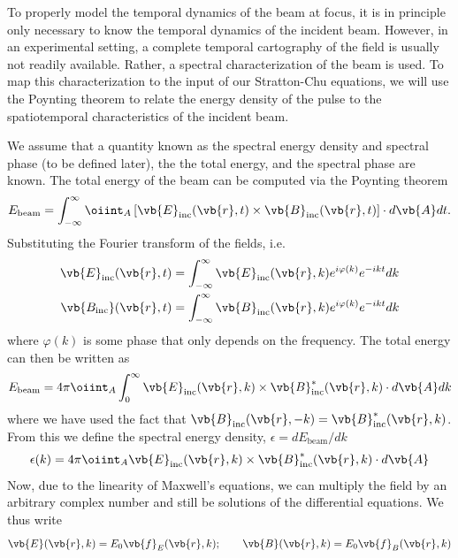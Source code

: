 \documentclass[11pt,SymmetricalJury]{inrsthesis/inrsthesis}
\begin{document}
To properly model the temporal dynamics of the beam at focus, it is in principle
only necessary to know the temporal dynamics of the incident beam. However, in
an experimental setting, a complete temporal cartography of the field is usually
not readily available. Rather, a spectral characterization of the beam is used.
To map this characterization to the input of our Stratton-Chu equations, we will
use the Poynting theorem to relate the energy density of the pulse to the
spatiotemporal characteristics of the incident beam.

We assume that a quantity known as the spectral energy density and spectral
phase (to be defined later), the the total energy, and the spectral phase are
known. The total energy of the beam can be computed via the Poynting theorem
  \begin{equation}
    E_\text{beam}
      =
      \int_{-\infty}^\infty \oiint_A
        \left[\vb{E}_\text{inc}(\vb{r},t)\times\vb{B}_\text{inc}(\vb{r},t)\right]\cdot d\vb{A}dt.
  \end{equation}
Substituting the Fourier transform of the fields, i.e.
  \begin{align}
    \vb{E}_\text{inc}(\vb{r},t) &=
      \int_{-\infty}^\infty
        \vb{E}_\text{inc}(\vb{r},k)e^{i\varphi(k)}e^{-ik t} dk \\
    \vb{B_\text{inc}}(\vb{r},t) &=
      \int_{-\infty}^\infty
        \vb{B}_\text{inc}(\vb{r},k)e^{i\varphi(k)}e^{-ik t} dk
  \end{align}
where $\varphi(k)$ is some phase that only depends on the frequency. The total
energy can then be written as
  \begin{equation}
    E_\text{beam} = 4\pi \oiint_A \int_0^\infty
        \real{\vb{E}_\text{inc}(\vb{r},k)\times\vb{B}_\text{inc}^*(\vb{r},k)}\cdot d\vb{A}dk
  \end{equation}
where we have used the fact that
$\vb{B}_\text{inc}(\vb{r},-k)=\vb{B}_\text{inc}^*(\vb{r},k)$. From this we
define the spectral energy density,  $\epsilon=dE_\text{beam}/dk$
  \begin{equation}
    \epsilon(k)
      = 4\pi\oiint_A \real{\vb{E}_\text{inc}(\vb{r},k)\times\vb{B}_\text{inc}^*(\vb{r},k)}\cdot d\vb{A}
  \end{equation}
Now, due to the linearity of Maxwell's equations, we can multiply the field by
an arbitrary complex number and still be solutions of the differential
equations. We thus write
  \begin{equation}
    \vb{E}(\vb{r},k) = E_0\vb{f}_E(\vb{r},k); \qquad
    \vb{B}(\vb{r},k) = E_0\vb{f}_B(\vb{r},k)
  \end{equation}
\end{document}
